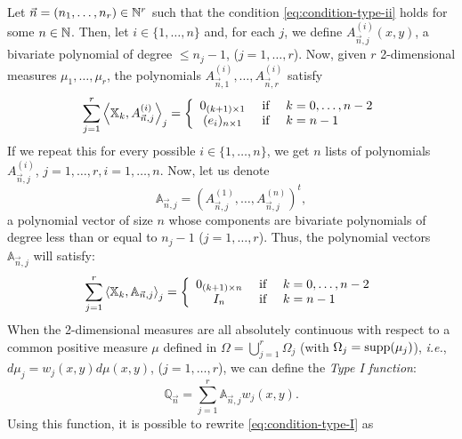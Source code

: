 \documentclass[portrait,final,a0paper,fontscale=0.38]{baposter}
\begin{document}
\begin{poster}
{
Let $\vec n = (n_1,\dots,n_r)\in\mathbb{N}^r$ such that the condition \eqref{eq:condition-type-ii} holds for some $n\in\mathbb{N}$. Then, let $i\in\{1,\dots,n\}$ and, for each $j$, we define $A_{\vec n, j}^{(i)}(x,y)$, a bivariate polynomial of degree $\leq n_j-1$, ($j=1,\dots,r$). Now, given $r$ 2-dimensional measures $\mu_1,\dots,\mu_r$, the polynomials $A_{\vec n, 1}^{(i)}, \dots, A_{\vec n, r}^{(i)}$ satisfy
\begin{equation}
    \label{eq:first-condition-type-I}
    \sum_{j=1}^r \left\langle \mathbb X_k , A_{\vec n,j}^{(i)} \right\rangle_j = \left\{\begin{array}{ccl}
        0_{(k+1)\times 1} &   \text{ if } & k=0,\dots,n-2 \\
        (e_i)_{n\times 1}  & \text{ if } & k=n-1      
    \end{array}\right.
\end{equation}
If we repeat this for every possible $i\in\{1,\dots,n\}$, we get $n$ lists of polynomials $A_{\vec n, j}^{(i)}$, $j=1,\dots,r, i=1,\dots,n$. Now, let us denote
$$
\mathbb A_{\vec n,j} = (A_{\vec n, j}^{(1)}, \dots, A_{\vec n, j}^{(n)})^t,
$$
a polynomial vector of size $n$ whose components are bivariate polynomials of degree less than or equal to $n_j-1$ ($j=1,\dots,r$). Thus, the polynomial vectors $\mathbb A_{\vec n,j}$ will satisfy:
\begin{equation}
    \label{eq:condition-type-I}
    \sum_{j=1}^r \left\langle \mathbb X_k , \mathbb A_{\vec n,j} \right\rangle_j = \left\{\begin{array}{ccl}
        0_{(k+1)\times n} &   \text{ if } & k=0,\dots,n-2 \\
        I_n & \text{ if } & k=n-1      
    \end{array}\right.
\end{equation}
When the 2-dimensional measures are all absolutely continuous with respect to a common positive measure $\mu$ defined in $\Omega = \displaystyle\bigcup_{j=1}^r \Omega_j$ (with $\Omega_j=\mathrm{supp}(\mu_j)$), \textit{i.e.}, $d\mu_j = w_j(x,y)d\mu(x,y)$, ($j=1,\dots,r$), we can define the \textit{Type I function}:
\begin{equation}
    \label{eq:type-I-function-2-vars}
    \mathbb Q_{\vec n} = \sum_{j=1}^r \mathbb A_{\vec n,j}w_j(x,y).
\end{equation}
Using this function, it is possible to rewrite \eqref{eq:condition-type-I} as
}
\end{poster}
\end{document}
